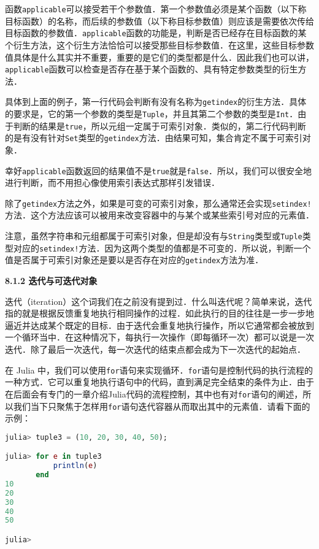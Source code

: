 函数\verb|applicable|可以接受若干个参数值．第一个参数值必须是某个函数（以下称目标函数）的名称，而后续的参数值（以下称目标参数值）则应该是需要依次传给目标函数的参数值．\verb|applicable|函数的功能是，判断是否已经存在目标函数的某个衍生方法，这个衍生方法恰恰可以接受那些目标参数值．在这里，这些目标参数值具体是什么其实并不重要，重要的是它们的类型都是什么．因此我们也可以讲，\verb|applicable|函数可以检查是否存在基于某个函数的、具有特定参数类型的衍生方法．

具体到上面的例子，第一行代码会判断有没有名称为\verb|getindex|的衍生方法．具体的要求是，它的第一个参数的类型是\verb|Tuple|，并且其第二个参数的类型是\verb|Int|．由于判断的结果是\verb|true|，所以元组一定属于可索引对象．类似的，第二行代码判断的是有没有针对\verb|Set|类型的\verb|getindex|方法．由结果可知，集合肯定不属于可索引对象．

幸好\verb|applicable|函数返回的结果值不是\verb|true|就是\verb|false|．所以，我们可以很安全地进行判断，而不用担心像使用索引表达式那样引发错误．

除了\verb|getindex|方法之外，如果是可变的可索引对象，那么通常还会实现\verb|setindex!|方法．这个方法应该可以被用来改变容器中的与某个或某些索引号对应的元素值．

注意，虽然字符串和元组都属于可索引对象，但是却没有与\verb|String|类型或\verb|Tuple|类型对应的\verb|setindex!|方法．因为这两个类型的值都是不可变的．所以说，判断一个值是否属于可索引对象还是要以是否存在对应的\verb|getindex|方法为准．

\textbf{8.1.2 迭代与可迭代对象}

迭代（iteration）这个词我们在之前没有提到过．什么叫迭代呢？简单来说，迭代指的就是根据反馈重复地执行相同操作的过程．如此执行的目的往往是一步一步地逼近并达成某个既定的目标．由于迭代会重复地执行操作，所以它通常都会被放到一个循环当中．在这种情况下，每执行一次操作（即每循环一次）都可以说是一次迭代．除了最后一次迭代，每一次迭代的结束点都会成为下一次迭代的起始点．

在 Julia 中，我们可以使用\verb|for|语句来实现循环．\verb|for|语句是控制代码的执行流程的一种方式．它可以重复地执行语句中的代码，直到满足完全结束的条件为止．由于在后面会有专门的一章介绍Julia代码的流程控制，其中也有对\verb|for|语句的阐述，所以我们当下只聚焦于怎样用\verb|for|语句迭代容器从而取出其中的元素值．请看下面的示例：
\begin{lstlisting}[language=julia]
julia> tuple3 = (10, 20, 30, 40, 50);

julia> for e in tuple3
           println(e)
       end
10
20
30
40
50

julia> 
\end{lstlisting}

